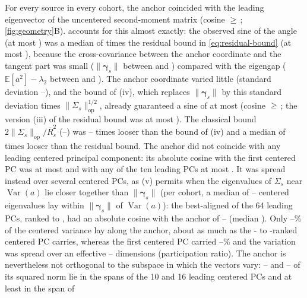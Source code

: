 \documentclass[10pt,letterpaper]{article}
\newcommand{\E}{\mathbb{E}}
\newcommand{\Rbar}{\bar{R}}
\begin{document}
For every source in every cohort, the anchor coincided with the leading eigenvector of the
uncentered second-moment matrix (cosine $\geq$\,\CosUncMin{}; \cref{fig:geometry}B). 
accounts for this almost exactly: the observed sine of the angle (at most \SinUncMax{}) was a
median of \BoundTightnessMedian{} times the residual bound in \cref{eq:residual-bound} (at most
\ResidualBoundMax{}), because the cross-covariance between the anchor coordinate and the tangent
part was small ($\lVert\bm{\gamma}_s\rVert$ between \CrossCovMin{} and \CrossCovMax) compared
with the eigengap ($\E[a^{2}]-\lambda_2$ between \GapMin{} and \GapMax). The anchor coordinate
varied little (standard deviation \CoordSDMin--\CoordSDMax), and the bound of (iv), which replaces
$\lVert\bm{\gamma}_s\rVert$ by this standard deviation times $\lVert\Sigma_s\rVert_{\mathrm{op}}^{1/2}$,
already guaranteed a sine of at most \ConcentrationBoundMax{} (cosine $\geq$\,\ConcentrationCosMin;
the version (iii) of the residual bound was at most \WeylBoundMax). The classical bound
$2\lVert\Sigma_s\rVert_{\mathrm{op}}/\Rbar_s^{2}$ (\DKBoundMin--\DKBoundMax) was
\DKOverConcentrationMin--\DKOverConcentrationMax{} times looser than the bound of (iv) and a median
of \DKOverResidualMedian{} times looser than the residual bound. The anchor did not coincide with any leading centered principal component:
its absolute cosine with the first centered PC was at most \CosCPConeMax{} and with any of the
ten leading PCs at most \CosCPCtenMax{}. It was spread instead over several centered PCs, as (v)
permits when the eigenvalues of $\Sigma_s$ near $\operatorname{Var}(a)$ lie closer
together than $\lVert\bm{\gamma}_s\rVert$ (per cohort, a median of \WindowCountMin--\WindowCountMax{}
centered eigenvalues lay within $\lVert\bm{\gamma}_s\rVert$ of $\operatorname{Var}(a)$): the best-aligned of the 64 leading PCs, ranked
\BestCPCRankMin{} to \BestCPCRankMax, had an absolute cosine with the anchor of
\BestCPCMin--\BestCPCMax{} (median \BestCPCMedian). Only \AnchorVarFracMin--\AnchorVarFracMax\% of the
centered variance lay along the anchor, about as much as the \AnchorRankMin- to
\AnchorRankMax-ranked centered PC carries, whereas the first centered PC carried
\CPConeVarFracMin--\CPConeVarFracMax\% and the variation was spread over an effective
\PRMin--\PRMax{} dimensions (participation ratio). The anchor is nevertheless not orthogonal to
the subspace in which the vectors vary: \SpanTenMin--\SpanTenMax{} and \SpanSixteenMin--\SpanSixteenMax{}
of its squared norm lie in the spans of the 10 and 16 leading centered PCs and at least \SpanSixtyFourMin{} in the span of
\end{document}
